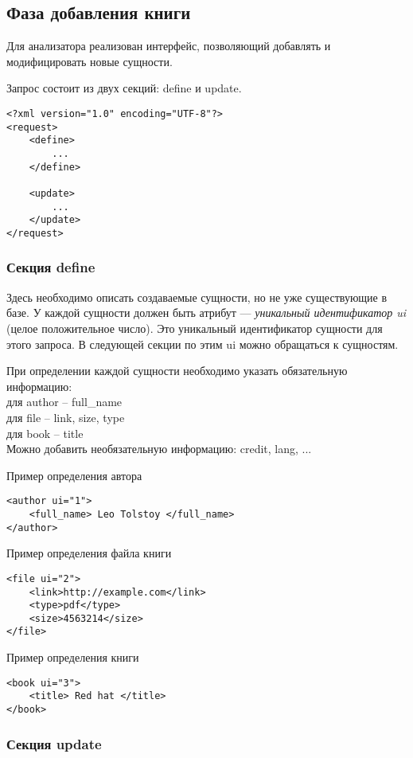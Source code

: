 \subsection{Фаза добавления книги}


Для анализатора реализован интерфейс, позволяющий добавлять и модифицировать новые сущности.

Запрос состоит из двух секций: define и update. 

\begin{verbatim}
<?xml version="1.0" encoding="UTF-8"?>
<request>
    <define>
        ...
    </define>

    <update>
        ...
    </update>
</request>
\end{verbatim}


\subsubsection{Секция define}

Здесь необходимо описать создаваемые сущности, но не уже существующие в базе. У каждой сущности должен быть атрибут --- {\em уникальный идентификатор ui} (целое положительное число). Это уникальный идентификатор сущности для этого запроса. В следующей секции по этим ui можно обращаться к сущностям. 

При определении каждой сущности необходимо указать обязательную информацию: \\
для author -- full\_name \\
для file -- link, size, type\\
для book -- title \\


Можно добавить необязательную информацию: credit, lang, ... 

Пример определения автора 
\begin{verbatim}
<author ui="1">
    <full_name> Leo Tolstoy </full_name>
</author>
\end{verbatim}

Пример определения файла книги 
\begin{verbatim}
<file ui="2">
    <link>http://example.com</link>
    <type>pdf</type>
    <size>4563214</size>
</file>
\end{verbatim}

Пример определения книги 
\begin{verbatim}
<book ui="3">
    <title> Red hat </title>
</book>
\end{verbatim}

\subsubsection{Секция update}

